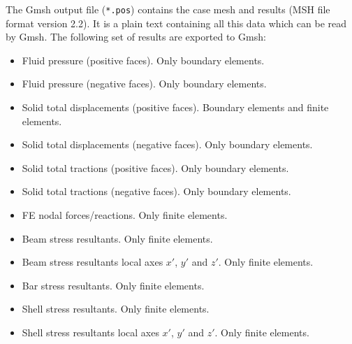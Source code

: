 \documentclass[a4paper,fleqn]{book}
\begin{document}
The Gmsh output file (\texttt{*.pos}) contains the case mesh and results (MSH file format version 2.2). It is a plain text containing all this data which can be read by Gmsh. The following set of results are exported to Gmsh:
\begin{itemize}
    \item Fluid pressure (positive faces). Only boundary elements.
    \item Fluid pressure (negative faces). Only boundary elements.
    \item Solid total displacements (positive faces). Boundary elements and finite elements.
    \item Solid total displacements (negative faces). Only boundary elements.
    \item Solid total tractions (positive faces). Only boundary elements.
    \item Solid total tractions (negative faces). Only boundary elements.
    \item FE nodal forces/reactions. Only finite elements.
    \item Beam stress resultants. Only finite elements.
    \item Beam stress resultants local axes $x'$, $y'$ and $z'$. Only finite elements.
    \item Bar stress resultants. Only finite elements.
    \item Shell stress resultants. Only finite elements.
    \item Shell stress resultants local axes $x'$, $y'$ and $z'$. Only finite elements.
\end{itemize}

%
%
\end{document}
